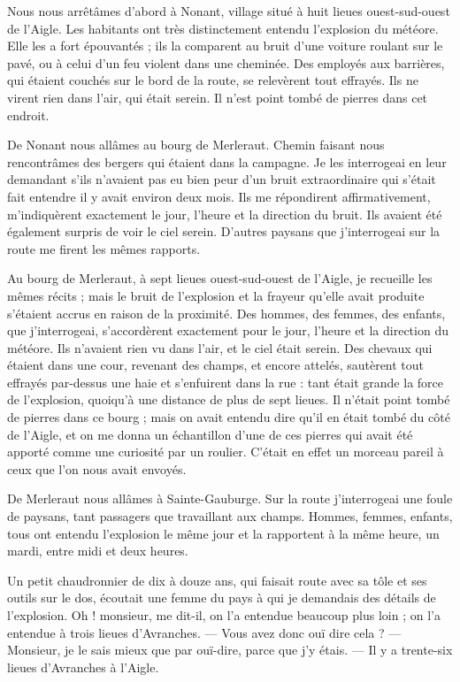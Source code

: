 \documentclass[a4paper, 11pt, oneside, polutonikogreek, french]{article}
\begin{document}
Nous nous arrêtâmes d'abord à Nonant, village situé à huit lieues ouest-sud-ouest de l'Aigle. Les habitants ont très distinctement entendu l'explosion du météore. Elle les a fort épouvantés ; ils la comparent au bruit d'une voiture roulant sur le pavé, ou à celui d'un feu violent dans une cheminée. Des employés aux barrières, qui étaient couchés sur le bord de la route, se relevèrent tout effrayés. Ils ne virent rien dans l'air, qui était serein. Il n'est point tombé de pierres dans cet endroit.

De Nonant nous allâmes au bourg de Merleraut. Chemin faisant nous rencontrâmes des bergers qui étaient dans la campagne. Je les interrogeai en leur demandant s'ils n'avaient pas eu bien peur d'un bruit extraordinaire qui s'était fait entendre il y avait environ deux mois. Ils me répondirent affirmativement, m'indiquèrent exactement le jour, l'heure et la direction du bruit. Ils avaient été également surpris de voir le ciel serein. D'autres paysans que j'interrogeai sur la route me firent les mêmes rapports.

Au bourg de Merleraut, à sept lieues ouest-sud-ouest de l'Aigle, je recueille les mêmes récits ; mais le bruit de l'explosion et la frayeur qu'elle avait produite s'étaient accrus en raison de la proximité. Des hommes, des femmes, des enfants, que j'interrogeai, s'accordèrent exactement pour le jour, l'heure et la direction du météore. Ils n'avaient rien vu dans l'air, et le ciel était serein. Des chevaux qui étaient dans une cour, revenant des champs, et encore attelés, sautèrent tout effrayés par-dessus une haie et s'enfuirent dans la rue : tant était grande la force de l'explosion, quoiqu'à une distance de plus de sept lieues. Il n'était point tombé de pierres dans ce bourg ; mais on avait entendu dire qu'il en était tombé du côté de l'Aigle, et on me donna un échantillon d'une de ces pierres qui avait été apporté comme une curiosité par un roulier. C'était en effet un morceau pareil à ceux que l'on nous avait envoyés.

De Merleraut nous allâmes à Sainte-Gauburge. Sur la route j'interrogeai une foule de paysans, tant passagers que travaillant aux champs. Hommes, femmes, enfants, tous ont entendu l'explosion le même jour et la rapportent à la même heure, un mardi, entre midi et deux heures.

Un petit chaudronnier de dix à douze ans, qui faisait route avec sa tôle et ses outils sur le dos, écoutait une femme du pays à qui je demandais des détails de l'explosion. Oh ! monsieur, me dit-il, on l'a entendue beaucoup plus loin ; on l'a entendue à trois lieues d'Avranches. --- Vous avez donc ouï dire cela ? --- Monsieur, je le sais mieux que par ouï-dire, parce que j'y étais. --- Il y a trente-six lieues d'Avranches à l'Aigle.
\end{document}
